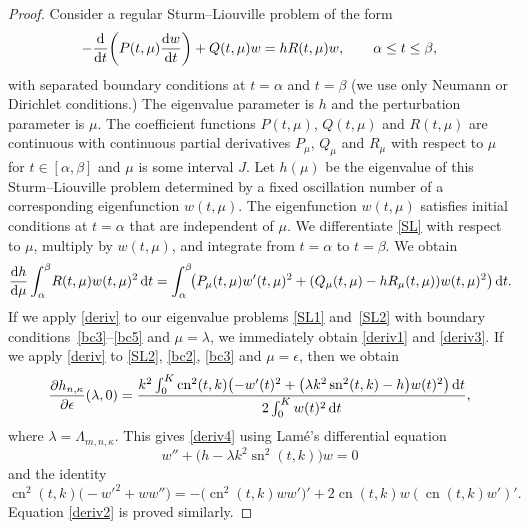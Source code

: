 \documentclass[pdftex]{sigma}
\DeclareMathOperator{\sn}{sn}
\DeclareMathOperator{\cn}{cn}
\numberwithin{equation}{section}
\begin{document}
\begin{proof}
Consider a regular Sturm--Liouville problem of the form
\begin{equation}\label{SL}
 -\frac{{\rm d}}{{\rm d}t}\biggl(P(t,\mu)\frac{{\rm d}w}{{\rm d}t}\biggr)+ Q(t,\mu) w= h R(t,\mu) w,\qquad \alpha\le t\le \beta,
\end{equation}
with separated boundary conditions at $t=\alpha$ and $t=\beta$ (we use only Neumann or Dirichlet conditions.)
The eigenvalue parameter is $h$ and the perturbation parameter is $\mu$. The coefficient functions $P(t,\mu)$,
$Q(t,\mu)$ and $R(t,\mu)$ are continuous with continuous partial derivatives $P_\mu$, $Q_\mu$ and $R_\mu$ with respect to $\mu$
for $t\in[\alpha,\beta]$ and $\mu$ is some interval $J$. Let $h(\mu)$ be the eigenvalue of this Sturm--Liouville problem
determined by a fixed oscillation number of a corresponding eigenfunction $w(t,\mu)$. The eigenfunction $w(t,\mu)$
satisfies initial conditions at $t=\alpha$ that are independent of $\mu$.
We differentiate \eqref{SL} with respect to $\mu$, multiply by $w(t,\mu)$, and integrate from $t=\alpha$ to $t=\beta$. We obtain
\begin{gather}
 \frac{{\rm d}h}{{\rm d}\mu} \int_\alpha^\beta\! R(t,\mu) w(t,\mu)^2\,{\rm d}t
 =\int_\alpha^\beta\! \bigl(P_\mu(t,\mu)w'(t,\mu)^2+(Q_\mu(t,\mu)-hR_\mu(t,\mu))w(t,\mu)^2\bigr)\,{\rm d}t.\!\label{deriv}
\end{gather}
If we apply \eqref{deriv} to our eigenvalue problems \eqref{SL1} and~\eqref{SL2} with boundary conditions~\eqref{bc3}--\eqref{bc5} and $\mu=\lambda$, we
immediately obtain \eqref{deriv1} and \eqref{deriv3}.
If we apply \eqref{deriv} to \eqref{SL2}, \eqref{bc2}, \eqref{bc3} and $\mu=\epsilon$, then we obtain
\[ \frac{\partial h_{n,\kappa}}{\partial \epsilon}(\lambda,0)=
\frac{k^2\int_0^K \cn^2(t,k) \bigl(-w'(t)^2+\bigl(\lambda k^2\sn^2(t,k)-h\bigr)w(t)^2\bigr)\,{\rm d}t}{2\int_0^K w(t)^2\,{\rm d}t},\]
where $\lambda=\Lambda_{m,n,\kappa}$.
This gives \eqref{deriv4} using Lam\'e's differential equation
\[w''+\bigl(h-\lambda k^2\sn^2(t,k)\bigr)w=0\]
and the identity
\[ \cn^2(t,k)\bigl(-w'^2+w w''\bigr)=-\bigl(\cn^2(t,k)w w'\bigr)'+2\cn(t,k)w(\cn(t,k)w')'. \]
Equation \eqref{deriv2} is proved similarly.
\end{proof}
\end{document}
